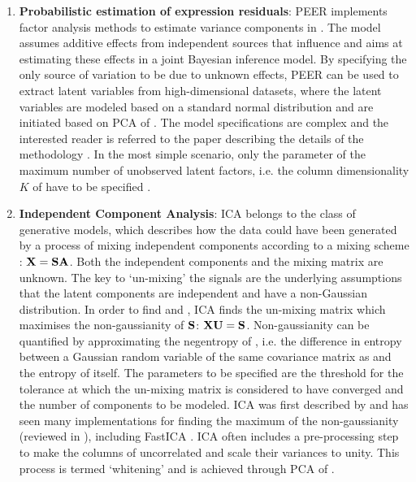 \begin{enumerate}
\item\textbf{Probabilistic estimation of expression residuals}: PEER implements factor analysis methods to estimate variance components in . The model assumes additive effects from independent sources that influence  and aims at estimating these effects in a joint Bayesian inference model.  By specifying the only source of variation to be due to unknown effects, PEER can be used to extract latent variables from high-dimensional datasets, where the latent variables are modeled based on a standard normal distribution and are initiated based on PCA of . The model specifications are complex and the interested reader is referred to the paper describing the details of the methodology \citep{Stegle2010}. In the most simple scenario, only the parameter of the maximum number of unobserved latent factors, i.e. the column dimensionality \(K\) of  have to be specified \citep{Stegle2012}. 

\item\textbf{Independent Component Analysis}:  ICA belongs to the class of generative models, which describes how the data  could have been generated by a process of mixing independent components  according to a mixing scheme : \(\boldsymbol{\mathbf{X}} = \boldsymbol{\mathbf{SA}}\). Both the independent components and the mixing matrix are unknown. The key to `un-mixing' the signals are the underlying assumptions that the latent components are independent and have a non-Gaussian distribution. In order to find  and , ICA finds the un-mixing matrix  which maximises the non-gaussianity of \(\boldsymbol{\mathbf{S}}\): \(\boldsymbol{\mathbf{XU}}=\boldsymbol{\mathbf{S}}\). Non-gaussianity can be quantified by approximating the negentropy of  , i.e. the difference in entropy between a Gaussian random variable of the same covariance matrix as  and the entropy of  itself. The parameters to be specified are the threshold for the tolerance at which the un-mixing matrix is considered to have converged and the number of components to be modeled.  ICA was first described by \citet{Herault1986} and has seen many implementations for finding the maximum of the non-gaussianity (reviewed in \citep{Comon1994}), including FastICA \citep{Hyvarinen2000}. ICA often includes a pre-processing step to make the columns of  uncorrelated and scale their variances to unity. This process is termed  `whitening' and is achieved through PCA of . 


\end{enumerate}
